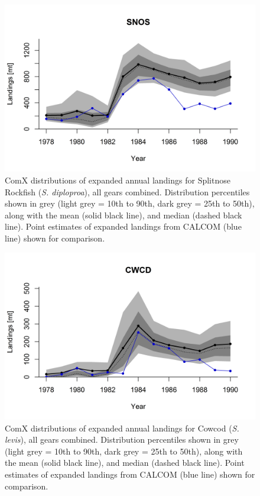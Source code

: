 \documentclass[12pt]{article}
\begin{document}
%
\clearpage
%

\begin{landscape}
\begin{figure}
\centering
\vspace{-2cm}
\includegraphics[width=1.3\textwidth]{./pictures/sp-yr/SNOS.png}
\caption{ComX distributions of expanded annual landings for Splitnose Rockfish 
(\textit{S. diploproa}), all gears combined. Distribution percentiles shown in grey 
(light grey = 10th to 90th, dark grey = 25th to 50th), along with the mean 
(solid black line), and median (dashed black line). Point estimates of 
expanded landings from CALCOM (blue line) shown for comparison.}
\label{Y9}
\end{figure}
\end{landscape}

%
\clearpage
%

\begin{landscape}
\begin{figure}
\centering
\vspace{-2cm}
\includegraphics[width=1.3\textwidth]{./pictures/sp-yr/CWCD.png}
\caption{ComX distributions of expanded annual landings for Cowcod 
(\textit{S. levis}), all gears combined. Distribution percentiles shown in grey 
(light grey = 10th to 90th, dark grey = 25th to 50th), along with the mean 
(solid black line), and median (dashed black line). Point estimates of 
expanded landings from CALCOM (blue line) shown for comparison.}
\label{Y10}
\end{figure}
\end{landscape}
\end{document}
